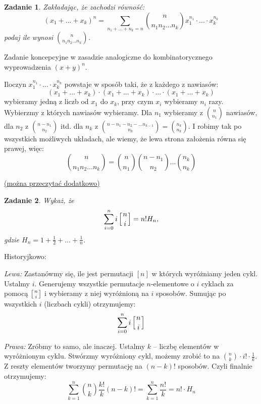 \documentclass{mwbk}
\newtheorem{zad}{Zadanie}[chapter]
\begin{document}
\begin{zad}
    Zakładając, że zachodzi równość:
    \[
        (x_1 + ... + x_k)^n = \sum_{n_1+...+n_k=n}\binom{n}{n_1 n_2 ... n_k}x_1^{n_1}\cdot...\cdot x_k^{n_k}
    \]
    podaj ile wynosi $\binom{n}{n_1 n_2 ... n_k}$.
\end{zad}
\begin{mdframed}
Zadanie koncepcyjne w zasadzie analogiczne do kombinatorycznego wyprowadzenia
$(x+y)^n$.

Iloczyn $x_1^{n_1}\cdot ... \cdot x_k^{n_k}$ powstaje w sposób taki, że z każdego z nawiasów:
\[(x_1 + ... + x_k) \cdot (x_1 + ... + x_k) \cdot ... \cdot (x_1 + ... + x_k)\]
wybieramy jedną z liczb od $x_1$ do $x_k$, przy czym $x_i$ wybieramy
$n_i$ razy.
Wybierzmy z których nawiasów wybieramy. Dla $n_1$ wybieramy z $\binom{n}{n_1}$
nawiasów, dla $n_2$ z $\binom{n-n_1}{n_2}$ itd. dla $n_k$ z
$\binom{n-n_1-n_2-...n_{k-1}}{n_k} = \binom{n_k}{n_k}$.
I robimy tak po wszystkich możliwych układach, ale wiemy, że lewa
strona założenia równa się prawej, więc:
\[
    \binom{n}{n_1 n_2 ... n_k} = \binom{n}{n_1} \binom{n-n_1}{n_2} ... \binom{n_k}{n_k}
\]

\begin{center}\href{https://lidicky.name/oldteaching/20.569X/l03%20-%20Binomial%20Theorem.pdf}{(można przeczytać dodatkowo)}\end{center}
\end{mdframed}




\begin{zad}
    Wykaż, że
    \[
        \sum_{i=0}^{n} i \left[ n \atop i \right] = n! H_n,
    \]
    gdzie $H_n = 1 + \frac{1}{2} + ... + \frac{1}{n}$.
\end{zad}
\begin{mdframed}
    Historyjkowo:

    \textit{Lewa:}
    Zastanówmy się, ile jest permutacji $[n]$ w których wyróżniamy jeden cykl.
    Ustalmy $i$. Generujemy wszystkie permutacje $n$-elementowe o $i$ cyklach za pomocą
    $\left[ n \atop i \right]$ i wybieramy z niej wyróżnioną na $i$ sposobów.
    Sumując po wszystkich $i$ (liczbach cykli) otrzymujemy:
    \[\sum_{i=0}^{n} i \left[ n \atop i \right]\]

    \textit{Prawa:}
    Zróbmy to samo, ale inaczej. Ustalmy $k$ -- liczbę elementów
    w wyróżnionym cyklu. Stwórzmy wyróżniony cykl,
    możemy zrobić to na $\binom{n}{k} \cdot i! \cdot \frac{1}{k}$.
    Z reszty elementów tworzymy permutację na $(n-k)!$ sposobów.
    Czyli finalnie otrzymujemy:
    \[
        \sum_{k=1}^{n}\binom{n}{k}\frac{k!}{k}(n-k)! = \sum_{k=1}^{n}\frac{n!}{k} = n! \cdot H_n
    \]




\end{mdframed}
\end{document}
